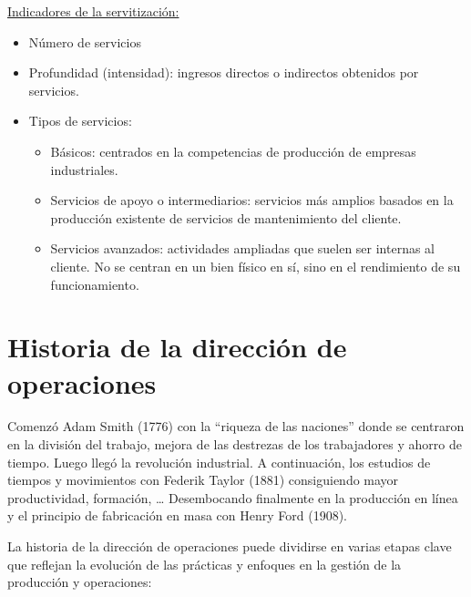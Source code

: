 \documentclass[12pt]{report} %
\providecommand{\tightlist}{%
  \setlength{\itemsep}{0pt}\setlength{\parskip}{0pt}}
\begin{document}
\underline{Indicadores de la servitización:}

\begin{itemize}
\tightlist
\item
  Número de servicios\\
\item
  Profundidad (intensidad): ingresos directos o indirectos obtenidos por
  servicios.\\
\item
  Tipos de servicios:

  \begin{itemize}
  \tightlist
  \item
    Básicos: centrados en la competencias de producción de empresas
    industriales.\\
  \item
    Servicios de apoyo o intermediarios: servicios más amplios basados
    en la producción existente de servicios de mantenimiento del
    cliente.\\
  \item
    Servicios avanzados: actividades ampliadas que suelen ser internas
    al cliente. No se centran en un bien físico en sí, sino en el
    rendimiento de su funcionamiento.
  \end{itemize}
\end{itemize}

\hypertarget{historia-de-la-direcciuxf3n-de-operaciones}{%
\section{Historia de la dirección de
operaciones}\label{historia-de-la-direcciuxf3n-de-operaciones}}

Comenzó Adam Smith (1776) con la ``riqueza de las naciones'' donde se
centraron en la división del trabajo, mejora de las destrezas de los
trabajadores y ahorro de tiempo. Luego llegó la revolución industrial. A
continuación, los estudios de tiempos y movimientos con Federik Taylor
(1881) consiguiendo mayor productividad, formación, \ldots{}
Desembocando finalmente en la producción en línea y el principio de
fabricación en masa con Henry Ford (1908).

La historia de la dirección de operaciones puede dividirse en varias
etapas clave que reflejan la evolución de las prácticas y enfoques en la
gestión de la producción y operaciones:
\end{document}
